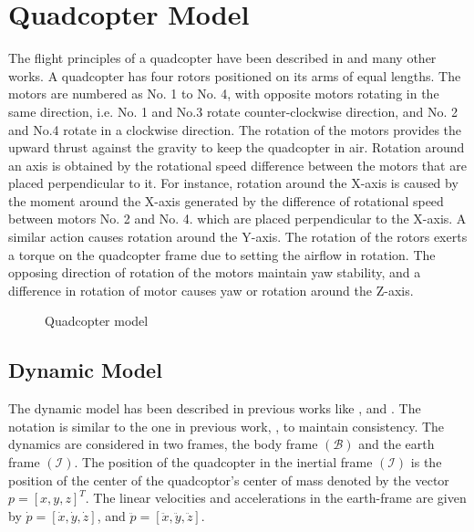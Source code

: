 \documentclass[letterpaper%
, twoside%
, 12pt%
,memoire%
, english%
,creativecommons,hyperref%
]{thETS}
\theoremstyle{newThmStyle}
\begin{document}
\chapter{Quadcopter Model} \label{Chap:Quad}
The flight principles of a quadcopter have been described in \citep{RN71} and many other works.
A quadcopter has four rotors positioned on its arms of equal lengths. The motors are numbered as No. 1 to No. 4, with opposite motors rotating in the same direction, i.e. No. 1 and No.3 rotate counter-clockwise direction, and No. 2 and No.4 rotate in a clockwise direction. The rotation of the motors provides the upward thrust against the gravity to keep the quadcopter in air. Rotation around an axis is obtained by the rotational speed difference between the motors that are placed perpendicular to it. For instance, rotation around the X-axis is caused by the moment around the X-axis generated by the difference of rotational speed between motors No. 2 and No. 4. which are placed perpendicular to the X-axis. A similar action causes rotation around the Y-axis. The rotation of the rotors exerts a torque on the quadcopter frame due to setting the airflow in rotation. The opposing direction of rotation of the motors maintain yaw stability, and a difference in rotation of motor causes yaw or rotation around the Z-axis.

\begin{figure}[H]
	\centering
	\resizebox{0.75\textwidth}{!}{\fbox{}}
	\parbox{0.75\textwidth}{\caption{Quadcopter model\label{Fig:quadSchematic}}}
\end{figure}



\section{Dynamic Model}
The dynamic model has been described in previous works like \citep{hoffmann2007quadrotor}, \citep{zheng2014second} and \citep{alexis2012model}. The notation is similar to the one in previous work, \citep{RN114}, to maintain consistency. 
The dynamics are considered in two frames, the body frame $(\mathcal{B})$ and the earth frame $(\mathcal{I})$. The position of the quadcopter in the inertial frame $(\mathcal{I})$ is the position of the center of the quadcoptor's center of mass denoted by the vector $p=[x,y,z]^{T}$. The linear velocities and accelerations in the earth-frame are given by $\dot{p}=[\dot{x},\dot{y},\dot{z}]$, and $\ddot{p}=[\ddot{x},\ddot{y},\ddot{z}]$. 
\end{document}
